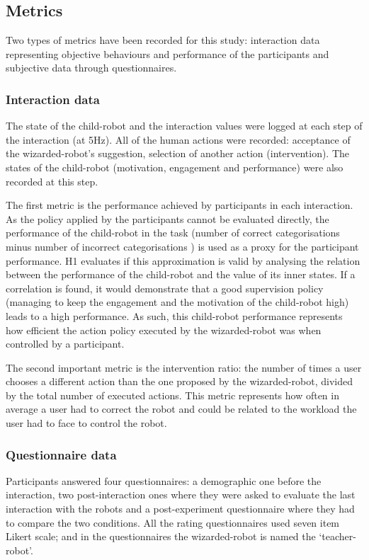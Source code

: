 \subsection{Metrics}

Two types of metrics have been recorded for this study: interaction data representing objective behaviours and performance of the participants and subjective data through questionnaires.

\subsubsection{Interaction data}

The state of the child-robot and the interaction values were logged at each step of the interaction (at 5Hz). All of the human actions were recorded: acceptance of the wizarded-robot's suggestion, selection of another action (intervention). The states of the child-robot (motivation, engagement and performance) were also recorded at this step. 

The first metric is the performance achieved by participants in each interaction. As the policy applied by the participants cannot be evaluated directly, the performance of the child-robot in the task (number of correct categorisations minus number of incorrect categorisations ) is used as a proxy for the participant performance. H1 evaluates if this approximation is valid by analysing the relation between the performance of the child-robot and the value of its inner states. If a correlation is found, it would demonstrate that a good supervision policy (managing to keep the engagement and the motivation of the child-robot high) leads to a high performance. As such, this child-robot performance represents how efficient the action policy executed by the wizarded-robot was when controlled by a participant.

The second important metric is the intervention ratio: the number of times a user chooses a different action than the one proposed by the wizarded-robot, divided by the total number of executed actions. This metric represents how often in average a user had to correct the robot and could be related to the workload the user had to face to control the robot.

\subsubsection{Questionnaire data}
 
Participants answered four questionnaires: a demographic one before the interaction, two post-interaction ones where they were asked to evaluate the last interaction with the robots and a post-experiment questionnaire where they had to compare the two conditions. All the rating questionnaires used seven item Likert scale; and in the questionnaires the wizarded-robot is named the `teacher-robot'.

